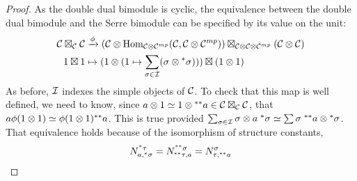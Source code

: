 \documentclass{amsart}
\begin{document}
\begin{proof}
As the double dual bimodule is cyclic, the equivalence between the double dual bimodule and the Serre bimodule can be specified by its value on the unit:
\begin{align}
\mathcal C \boxtimes_{\mathcal C} \mathcal C 
& \xrightarrow{\phi} 
(\mathcal C \otimes \operatorname{Hom}_{\mathcal C \otimes \mathcal C^{mp}}(\mathcal C, \mathcal C \otimes \mathcal C^{mp})) \boxtimes_{\mathcal C \otimes \mathcal C \otimes \mathcal C^{mp}} (\mathcal C \otimes \mathcal C) 
\nonumber\\
1 \boxtimes 1 
& \mapsto 
(1 \otimes (1 \mapsto \sum_{\sigma \in \mathcal I} (\sigma \otimes {}^*{\sigma}))) \boxtimes (1 \otimes 1)
\nonumber
\end{align}
As before, $\mathcal I$ indexes the simple objects of $\mathcal C$.  To check that this map is well defined, we need to know, since $a \otimes 1 \simeq 1 \otimes {}^{**}{a} \in \mathcal C \boxtimes_{\mathcal C} \mathcal C$, that $a \phi(1 \otimes 1) \simeq \phi(1 \otimes 1) {}^{**}{a}$.    This is true provided $\sum_{\sigma \in \mathcal I} \sigma \otimes a \; {}^*{\sigma} \simeq \sum \sigma \; {}^{**}{a} \otimes {}^*{\sigma}$.  That equivalence holds because of the isomorphism of structure constants,
\begin{equation}
N^{{}^*{\tau}}_{a, {}^*{\sigma}} = N^{{}^{**}{\sigma}}_{{}^{**}{\tau}, a} = N^{\sigma}_{\tau, {}^{**}{a}} \nonumber
\end{equation}



\end{proof}

\end{document}

